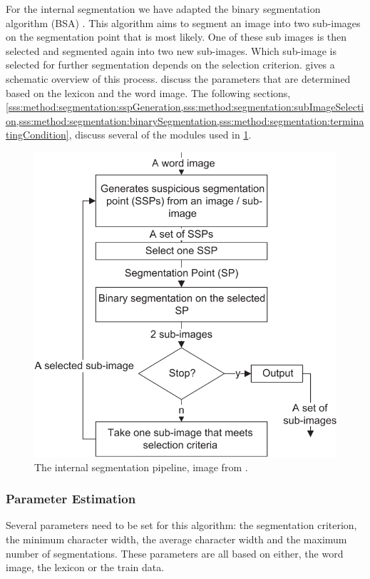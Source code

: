 For the internal segmentation we have adapted the binary segmentation algorithm (BSA) \cite{lee2012binary}. This algorithm aims to segment an image into two sub-images on the segmentation point that is most likely. One of these sub images is then selected and segmented again into two new sub-images. Which sub-image is selected for further segmentation depends on the selection criterion.  gives a schematic overview of this process.  discuss the parameters that are determined based on the lexicon and the word image. The following sections, \cref{sss:method:segmentation:sspGeneration,sss:method:segmentation:subImageSelection,sss:method:segmentation:binarySegmentation,sss:method:segmentation:terminatingCondition}, discuss several of the modules used in \cref{fig:method:segmentation:overview}.

\begin{figure}
	\centering
	\includegraphics[width=\columnwidth]{shared/img/method/segmentation_pipeline.png}
	\caption{The internal segmentation pipeline, image from \cite{lee2012binary}.}
	\label{fig:method:segmentation:overview}
\end{figure}

\subsubsection{Parameter Estimation}
	\label{sss:method:segmentation:parameterEstimation}
	Several parameters need to be set for this algorithm: the segmentation criterion, the minimum character width, the average character width and the maximum number of segmentations. These parameters are all based on either, the word image, the lexicon or the train data.

